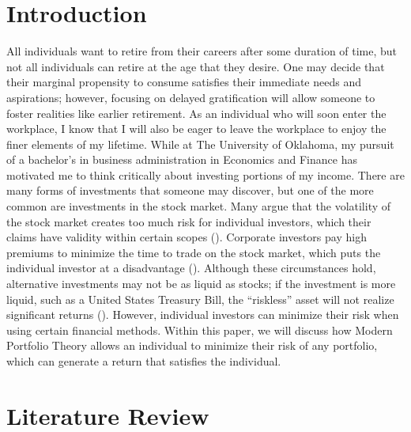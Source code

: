 \documentclass[12pt,english]{article}
\begin{document}
    \begin{doublespace}


    \section{Introduction}\label{sec:intro}\indent{}\indent{} %
    
       All individuals want to retire from their careers after some duration of time, but not all individuals can retire at the age that they desire. One may decide that their marginal propensity to consume satisfies their immediate needs and aspirations; however, focusing on delayed gratification will allow someone to foster realities like earlier retirement. As an individual who will soon enter the workplace, I know that I will also be eager to leave the workplace to enjoy the finer elements of my lifetime. While at The University of Oklahoma, my pursuit of a bachelor’s in business administration in Economics and Finance has motivated me to think critically about investing portions of my income. There are many forms of investments that someone may discover, but one of the more common are investments in the stock market. Many argue that the volatility of the stock market creates too much risk for individual investors, which their claims have validity within certain scopes (\citet{Zucker2020}). Corporate investors pay high premiums to minimize the time to trade on the stock market, which puts the individual investor at a disadvantage (\citet{Patter2020}). Although these circumstances hold, alternative investments may not be as liquid as stocks; if the investment is more liquid, such as a United States Treasury Bill, the “riskless” asset will not realize significant returns (\citet{Canady2020}). However, individual investors can minimize their risk when using certain financial methods. Within this paper, we will discuss how Modern Portfolio Theory allows an individual to minimize their risk of any portfolio, which can generate a return that satisfies the individual.  


    \section{Literature Review}\label{sec:litreview}\indent{}\indent{} %
    

\end{doublespace}
\end{document}
